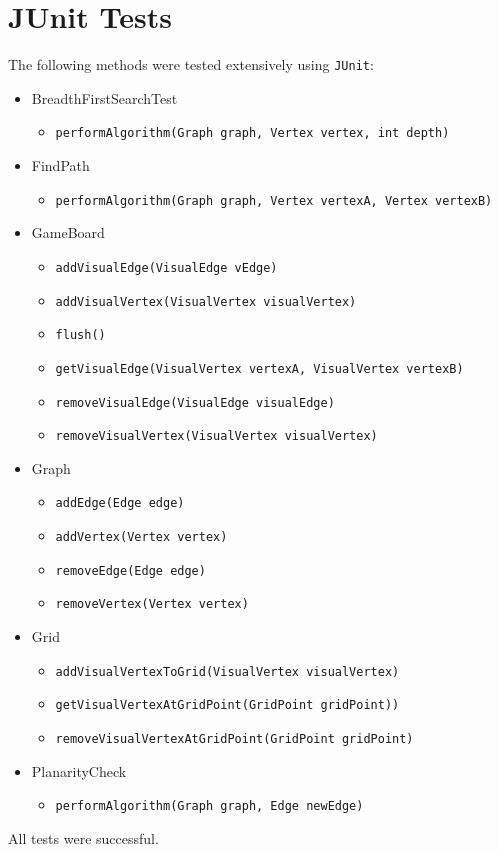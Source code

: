 \section{JUnit Tests}
The following methods were tested extensively using \texttt{JUnit}:


\begin{itemize}
\item BreadthFirstSearchTest
	\begin{itemize}
	\item \texttt{performAlgorithm(Graph graph, Vertex vertex, int depth)}
	\end{itemize}
	
\item FindPath
	\begin{itemize}
	\item \texttt{performAlgorithm(Graph graph, Vertex vertexA, Vertex vertexB)}
	\end{itemize}

\item GameBoard
	\begin{itemize}
	\item \texttt{addVisualEdge(VisualEdge vEdge)}
	\item \texttt{addVisualVertex(VisualVertex visualVertex)}
	\item \texttt{flush()}
	\item \texttt{getVisualEdge(VisualVertex vertexA, VisualVertex vertexB)}
	\item \texttt{removeVisualEdge(VisualEdge visualEdge)}
	\item \texttt{removeVisualVertex(VisualVertex visualVertex)}
	\end{itemize}
	
\item Graph
	\begin{itemize}
	\item \texttt{addEdge(Edge edge)}
	\item \texttt{addVertex(Vertex vertex)}
	\item \texttt{removeEdge(Edge edge)}
	\item \texttt{removeVertex(Vertex vertex)}
	\end{itemize}
	
\item Grid
	\begin{itemize}
	\item \texttt{addVisualVertexToGrid(VisualVertex visualVertex)}
	\item \texttt{getVisualVertexAtGridPoint(GridPoint gridPoint))}
	\item \texttt{removeVisualVertexAtGridPoint(GridPoint gridPoint)}
	\end{itemize}
	
\item PlanarityCheck
	\begin{itemize}
	\item \texttt{performAlgorithm(Graph graph, Edge newEdge)}
	\end{itemize}
\end{itemize}

All tests were successful.